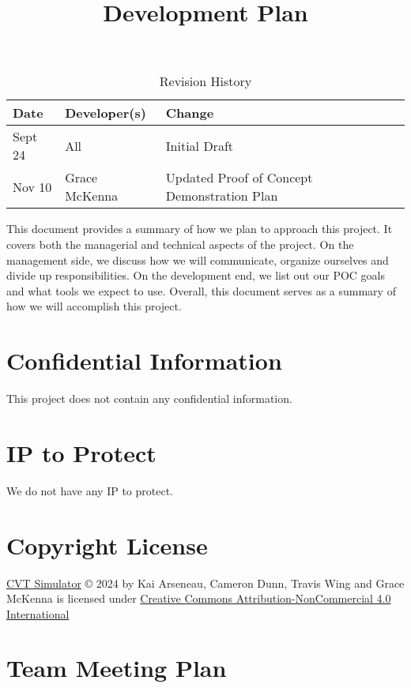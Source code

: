 \documentclass{article}
\title{Development Plan\\\progname}
\author{\authname}
\date{}
\begin{document}
\maketitle

\begin{table}[hp]
\caption{Revision History} \label{TblRevisionHistory}
\begin{tabularx}{\textwidth}{llX}
\toprule
\textbf{Date} & \textbf{Developer(s)} & \textbf{Change}\\
\midrule
Sept 24 & All & Initial Draft\\
Nov 10 & Grace McKenna & Updated Proof of Concept Demonstration Plan\\
\bottomrule
\end{tabularx}
\end{table}

\newpage{}

\noindent
This document provides a summary of how we plan to approach this project.
It covers both the managerial and technical aspects of the project.
On the management side, we discuss how we will communicate, organize ourselves and divide up responsibilities.
On the development end, we list out our POC goals and what tools we expect to use.
Overall, this document serves as a summary of how we will accomplish this project.

\section{Confidential Information}

This project does not contain any confidential information.

\section{IP to Protect}

We do not have any IP to protect.

\section{Copyright License}

\href{https://github.com/gr812b/CVT-Simulator}{CVT Simulator} © 2024 by 
Kai Arseneau, Cameron Dunn, Travis Wing and Grace McKenna is licensed under 
\href{https://creativecommons.org/licenses/by-nc/4.0/?ref=chooser-v1}{Creative Commons Attribution-NonCommercial 4.0 International}

\section{Team Meeting Plan}
\end{document}
